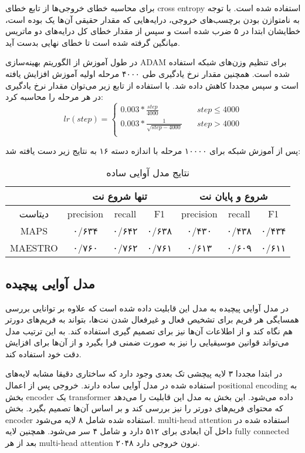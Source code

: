 برای محاسبه خطای خروجی‌ها از تابع خطای \gls{cross entropy} استفاده شده است. با
توجه به نامتوازن بودن برچسب‌های خروجی، درایه‌هایی که مقدار حقیقی آن‌ها یک بوده
است، خطایشان ابتدا در ۵ ضرب شده است و سپس از مقدار خطای کل درایه‌های دو ماتریس
میانگین گرفته شده است تا خطای نهایی بدست آید.

در طول آموزش از الگوریتم بهینه‌سازی ADAM برای تنظیم وزن‌های شبکه استفاده شده
است. همچنین مقدار نرخ یادگیری طی ۴۰۰۰ مرحله اولیه آموزش افزایش یافته است و سپس
مجددا کاهش داده شد. با استفاده از تابع زیر می‌توان مقدار نرخ یادگیری در هر مرحله
را محاسبه کرد:
\begin{equation}
    lr(step) =
    \begin{cases}
        0.003 * \frac{step}{4000} &\quad step \leq 4000\\
        0.003 * \frac{1}{\sqrt{step - 4000}} &\quad step > 4000\\
    \end{cases}
\end{equation}

پس از آموزش شبکه برای ۱۰۰۰۰ مرحله با اندازه دسته ۱۶ به نتایج زیر دست یافته شد:
\begin{table}[ht]
    \centering
    \begin{tabular}{|c|c|c|c|c|c|c|}
        \hline
        & \multicolumn{3}{|c|}{تنها شروع نت} & \multicolumn{3}{|c|}{شروع و پایان نت} \\
        \hline
        دیتاست & \gls{precision} & \gls{recall} & F1 & \gls{precision} & \gls{recall} & F1 \\
        \hline
        MAPS & ۰/۶۳۴ & ۰/۶۴۲ & ۰/۶۳۸ & ۰/۴۳۰ & ۰/۴۳۸ & ۰/۴۳۴ \\
        \hline
        MAESTRO & ۰/۷۶۰ & ۰/۷۶۲ & ۰/۷۶۱ & ۰/۶۱۳ & ۰/۶۰۹ & ۰/۶۱۱ \\
        \hline
    \end{tabular}
    \caption{نتایج مدل آوایی ساده}
\end{table}

\subsection{مدل آوایی پیچیده}
در مدل آوایی پیچیده به مدل این قابلیت داده شده است که علاوه بر توانایی بررسی
همسایگی هر فریم برای تشخیص فعال و غیرفعال شدن نت‌ها، بتواند به فریم‌های دورتر هم
نگاه کند و از اطلاعات آن‌ها نیز برای تصمیم گیری استفاده کند. به این ترتیب مدل
می‌تواند قوانین موسیقیایی را نیز به صورت ضمنی فرا بگیرد و از آن‌ها برای افزایش
دقت خود استفاده کند.

در ابتدا مجددا ۳ لایه پیچشی تک بعدی وجود دارد که ساختاری دقیقا مشابه لایه‌های
استفاده شده در مدل آوایی ساده دارند. خروجی پس از اعمال \gls{positional encoding}
به بخش \gls{encoder} یک \gls{transformer} داده می‌شود. این بخش به مدل این قابلیت
را می‌دهد که محتوای فریم‌های دورتر را نیز بررسی کند و بر اساس آن‌ها تصمیم بگیرد.
بخش \gls{encoder} استفاده شده شامل ۸ لایه می‌شود. \gls{multi-head attention}
استفاده شده در داخل آن ابعادی برای ۵۱۲ دارد و شامل ۴ سر می‌شود. همچنین لایه
\gls{fully connected} بعد از هر \gls{multi-head attention} ۲۰۴۸ نرون خروجی دارد.


